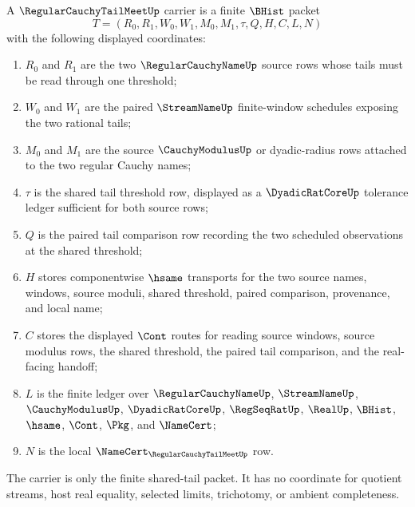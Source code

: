 \begin{definition}
\label{def:regular-cauchy-tail-meet-carrier}
A $\RegularCauchyTailMeetUp$ carrier is a finite $\BHist$ packet
$$
T=(R_0,R_1,W_0,W_1,M_0,M_1,\tau,Q,H,C,L,N)
$$
with the following displayed coordinates:
\begin{enumerate}
\item $R_0$ and $R_1$ are the two $\RegularCauchyNameUp$ source rows whose tails must be read through one threshold;
\item $W_0$ and $W_1$ are the paired $\StreamNameUp$ finite-window schedules exposing the two rational tails;
\item $M_0$ and $M_1$ are the source $\CauchyModulusUp$ or dyadic-radius rows attached to the two regular Cauchy names;
\item $\tau$ is the shared tail threshold row, displayed as a $\DyadicRatCoreUp$ tolerance ledger sufficient for both source rows;
\item $Q$ is the paired tail comparison row recording the two scheduled observations at the shared threshold;
\item $H$ stores componentwise $\hsame$ transports for the two source names, windows, source moduli, shared threshold, paired comparison, provenance, and local name;
\item $C$ stores the displayed $\Cont$ routes for reading source windows, source modulus rows, the shared threshold, the paired tail comparison, and the real-facing handoff;
\item $L$ is the finite ledger over $\RegularCauchyNameUp$, $\StreamNameUp$, $\CauchyModulusUp$, $\DyadicRatCoreUp$, $\RegSeqRatUp$, $\RealUp$, $\BHist$, $\hsame$, $\Cont$, $\Pkg$, and $\NameCert$;
\item $N$ is the local $\NameCert_{\RegularCauchyTailMeetUp}$ row.
\end{enumerate}
The carrier is only the finite shared-tail packet. It has no coordinate for quotient streams, host real equality, selected limits, trichotomy, or ambient completeness.
\end{definition}

